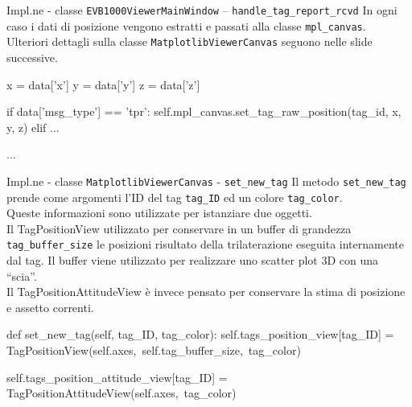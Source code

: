 \begin{frame}[fragile, shrink=10]{Impl.ne - classe \lstinline!EVB1000ViewerMainWindow! -- \lstinline!handle_tag_report_rcvd!}
  In ogni caso  i dati di posizione vengono estratti e passati alla classe \lstinline!mpl_canvas!.\\
  Ulteriori dettagli sulla classe \lstinline!MatplotlibViewerCanvas! seguono nelle slide successive.
  \begin{Python}
            x = data['x']
            y = data['y']
            z = data['z']

            if data['msg_type'] == 'tpr':
                self.mpl_canvas.set_tag_raw_position(tag_id, x, y, z)
            elif ...

            ...
  \end{Python}
\end{frame}


\begin{frame}[fragile, shrink=15]{Impl.ne - classe \lstinline!MatplotlibViewerCanvas! - \lstinline!set_new_tag!}
  Il metodo \lstinline!set_new_tag! prende come argomenti l'ID del tag \lstinline!tag_ID! ed un colore
  \lstinline!tag_color!.\\
  Queste informazioni sono utilizzate per istanziare due oggetti.\\
  Il TagPositionView utilizzato per conservare in un buffer di grandezza \lstinline!tag_buffer_size! le posizioni risultato
  della trilaterazione eseguita internamente dal tag. Il buffer viene utilizzato per realizzare uno scatter plot 3D con una ``scia''.\\
  Il TagPositionAttitudeView è invece pensato per conservare la stima di posizione e assetto correnti.
  \begin{Python}
    def set_new_tag(self, tag_ID, tag_color):
        self.tags_position_view[tag_ID] = 
             TagPositionView(self.axes,\
                             self.tag_buffer_size,\
                             tag_color)

        self.tags_position_attitude_view[tag_ID] = 
             TagPositionAttitudeView(self.axes,\
                                     tag_color) 
  \end{Python}
\end{frame}

